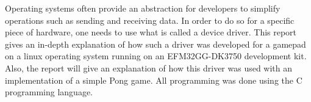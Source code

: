 Operating systems often provide an abstraction for developers to simplify operations such as sending and receiving data. In order to do so for a specific piece of hardware, one needs to use what is called a device driver. This report gives an in-depth explanation of how such a driver was developed for a gamepad on a linux operating system running on an EFM32GG-DK3750 development kit. Also, the report will give an explanation of how this driver was used with an implementation of a simple Pong game. All programming was done using the C programming language.
